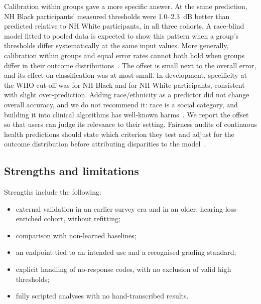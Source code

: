\documentclass[11pt]{article}
\begin{document}
Calibration within groups gave a more specific answer. At the same prediction, NH Black participants' measured thresholds were 1.0--2.3~dB better than predicted relative to NH White participants, in all three cohorts. A race-blind model fitted to pooled data is expected to show this pattern when a group's thresholds differ systematically at the same input values. More generally, calibration within groups and equal error rates cannot both hold when groups differ in their outcome distributions~\cite{kleinberg2017,chouldechova2017}. The offset is small next to the overall error, and its effect on classification was at most small. In development, specificity at the WHO cut-off was \SpecXgbBlackDev{} for NH Black and \SpecXgbWhiteDev{} for NH White participants, consistent with slight over-prediction. Adding race/ethnicity as a predictor did not change overall accuracy, and we do not recommend it: race is a social category, and building it into clinical algorithms has well-known harms~\cite{rajkomar2018}. We report the offset so that users can judge its relevance to their setting. Fairness audits of continuous health predictions should state which criterion they test and adjust for the outcome distribution before attributing disparities to the model~\cite{barnett2005,vancalster2019}.

\subsection*{Strengths and limitations}
Strengths include the following:
\begin{itemize}
\item external validation in an earlier survey era and in an older, hearing-loss-enriched cohort, without refitting;
\item comparison with non-learned baselines;
\item an endpoint tied to an intended use and a recognised grading standard;
\item explicit handling of no-response codes, with no exclusion of valid high thresholds;
\item fully scripted analyses with no hand-transcribed results.
\end{itemize}
\end{document}
